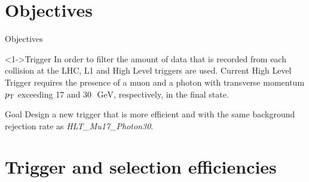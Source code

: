 \documentclass[aspectratio = 1610, xcolor = dvipsnames]{beamer}
\newcommand{\GeV}{\textrm{ }\mathrm{GeV}}
\newcommand{\pt}{p_{\rm T}}
\newcommand{\red}{\textcolor{unipd}}
\begin{document}
	
    \section{Objectives}

    \begin{frame}[t]{Objectives}

        \begin{block}<1->{Trigger}
            In order to filter the amount of data that is recorded from each collision at the LHC, L1 and High Level triggers are used. Current High Level Trigger requires the presence of a muon and a photon with transverse momentum $\pt$ exceeding 17 and $30\GeV$, respectively, in the final state.
        \end{block}
        
        \vspace{1cm}
        
        \begin{alertblock}{\red{Goal}}
            Design a new trigger that is \red{more efficient} and with the \red{same background rejection rate} as {\it HLT\_Mu17\_Photon30}.
        \end{alertblock}

    \end{frame}
	
	
	\section{Trigger and selection efficiencies}
    
\end{document}
